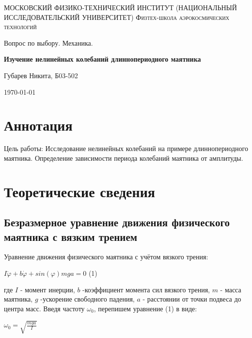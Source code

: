 \documentclass[a4paper]{article}
\begin{document}
\begin{titlepage}
	\centering
	{\scshape\Large МОСКОВСКИЙ ФИЗИКО-ТЕХНИЧЕСКИЙ ИНСТИТУТ 
	(НАЦИОНАЛЬНЫЙ ИССЛЕДОВАТЕЛЬСКИЙ УНИВЕРСИТЕТ) %
    Физтех-школа аэрокосмических технологий}
	
	\vspace{4cm} %
	{\LARGE Вопрос по выбору. Механика.}
	\vspace{1cm} %
	
{\huge\bf Изучение нелинейных колебаний  длиннопериодного маятника}
	
	\vspace{1cm} %
	\vfill %
	
    \begin{flushright} %
	   {\LARGE Губарев Никита, Б03-502}
    \end{flushright}
    \vfill 
	\today %
\end{titlepage}
\tableofcontents 
 \section{Аннотация}
Цель работы: Исследование нелинейных колебаний на примере длиннопериодного маятника. Определение зависимости периода колебаний маятника от амплитуды.

\section{Теоретические сведения}
\subsection{Безразмерное уравнение движения физического маятника с вязким трением}
Уравнение движения физического маятника с учётом вязкого трения:

\begin{center}$I\ddot{\varphi}+b\dot{\varphi}+sin(\varphi)mga =0$ (1)\end{center}
где $I$ - момент инерции, $b$ -коэффициент момента сил вязкого трения, $m$ - масса маятника, $g$ -ускорение свободного падения, $a$ - расстоянии от точки подвеса до центра масс. Введя частоту $\omega_0$, перепишем уравнение (1) в виде:

\begin{center}$\omega_0=\sqrt{\frac{mga}{I}}$\end{center}
\end{document}
